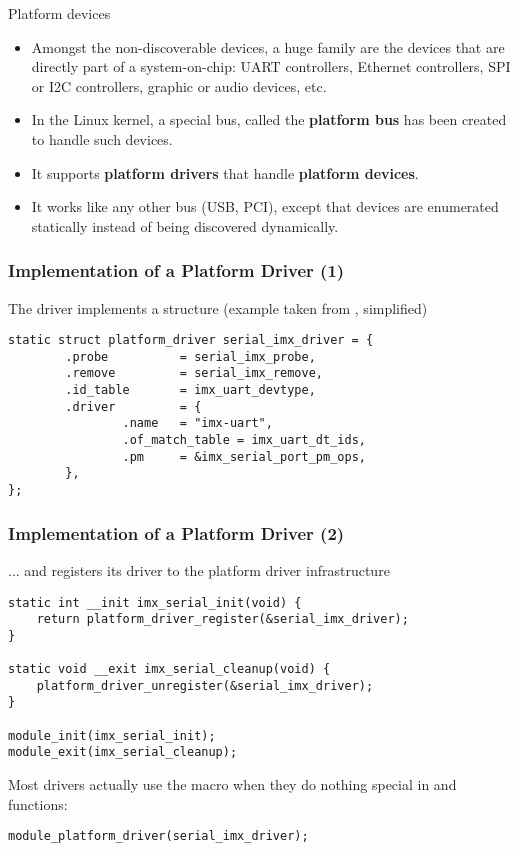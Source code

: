 \begin{frame}{Platform devices}
  \begin{itemize}
  \item Amongst the non-discoverable devices, a huge family are the
    devices that are directly part of a system-on-chip: UART
    controllers, Ethernet controllers, SPI or I2C controllers, graphic
    or audio devices, etc.
  \item In the Linux kernel, a special bus, called the {\bf platform
      bus} has been created to handle such devices.
  \item It supports {\bf platform drivers} that handle {\bf platform
      devices}.
  \item It works like any other bus (USB, PCI), except that devices
    are enumerated statically instead of being discovered dynamically.
  \end{itemize}
\end{frame}

\begin{frame}[fragile]
  \frametitle{Implementation of a Platform Driver (1)}
  The driver implements a 
  structure (example taken from ,
  simplified)
  \begin{block}{}
  \begin{verbatim}
static struct platform_driver serial_imx_driver = {
        .probe          = serial_imx_probe,
        .remove         = serial_imx_remove,
        .id_table       = imx_uart_devtype,
        .driver         = {
                .name   = "imx-uart",
                .of_match_table = imx_uart_dt_ids,
                .pm     = &imx_serial_port_pm_ops,
        },
};
\end{verbatim}
\end{block}
\end{frame}


\begin{frame}[fragile]
  \frametitle{Implementation of a Platform Driver (2)}
  ... and registers its driver to the platform driver infrastructure
  \begin{block}{}
  \begin{verbatim}
static int __init imx_serial_init(void) {
    return platform_driver_register(&serial_imx_driver);
}

static void __exit imx_serial_cleanup(void) {
    platform_driver_unregister(&serial_imx_driver);
}

module_init(imx_serial_init);
module_exit(imx_serial_cleanup);
  \end{verbatim}
\end{block}
Most drivers actually use the 
macro when they do nothing special in  and  functions:
  \begin{block}{}
  \begin{verbatim}
module_platform_driver(serial_imx_driver);
  \end{verbatim}
\end{block}
\end{frame}

